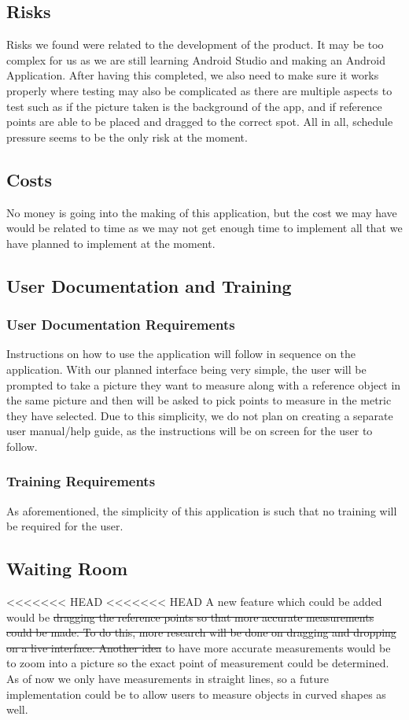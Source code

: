 \documentclass[12pt, titlepage]{article}
\begin{document}
\subsection{Risks}
Risks we found were related to the development of the product. It may be too complex for us as we are still learning Android Studio and making an Android Application. After having this completed, we also need to make sure it works properly where testing may also be complicated as there are multiple aspects to test such as if the picture taken is the background of the app, and if reference points are able to be placed and dragged to the correct spot. All in all, schedule pressure seems to be the only risk at the moment.

\subsection{Costs}
No money is going into the making of this application, but the cost we may have would be related to time as we may not get enough time to implement all that we have planned to implement at the moment. 

\subsection{User Documentation and Training}
\subsubsection{User Documentation Requirements}
Instructions on how to use the application will follow in sequence on the application. With our planned interface being very simple, the user will be prompted to take a picture they want to measure along with a reference object in the same picture and then will be asked to pick points to measure in the metric they have selected. Due to this simplicity, we do not plan on creating a separate user manual/help guide, as the instructions will be on screen for the user to follow.

\subsubsection{Training Requirements}
As aforementioned, the simplicity of this application is such that no training will be required for the user.

\subsection{Waiting Room}
<<<<<<< HEAD
<<<<<<< HEAD
A new feature which could be added would be \sout{dragging the reference points so that more accurate measurements could be made. To do this, more research will be done on dragging and dropping on a live interface. Another idea} to have more accurate measurements would be to zoom into a picture so the exact point of measurement could be determined. As of now we only have measurements in straight lines, so a future implementation could be to allow users to measure objects in curved shapes as well. 
\end{document}
